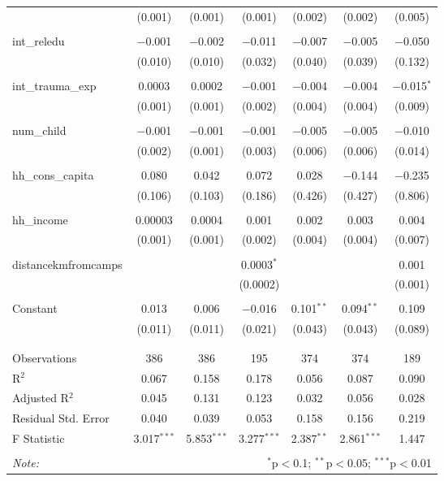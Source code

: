 \begin{table}[H]
\begin{tabular}{@{\extracolsep{4pt}}lcccccc}
  & (0.001) & (0.001) & (0.001) & (0.002) & (0.002) & (0.005) \\ 
  & & & & & & \\ 
 int\_reledu & $-$0.001 & $-$0.002 & $-$0.011 & $-$0.007 & $-$0.005 & $-$0.050 \\ 
  & (0.010) & (0.010) & (0.032) & (0.040) & (0.039) & (0.132) \\ 
  & & & & & & \\ 
 int\_trauma\_exp & 0.0003 & 0.0002 & $-$0.001 & $-$0.004 & $-$0.004 & $-$0.015$^{*}$ \\ 
  & (0.001) & (0.001) & (0.002) & (0.004) & (0.004) & (0.009) \\ 
  & & & & & & \\ 
 num\_child & $-$0.001 & $-$0.001 & $-$0.001 & $-$0.005 & $-$0.005 & $-$0.010 \\ 
  & (0.002) & (0.001) & (0.003) & (0.006) & (0.006) & (0.014) \\ 
  & & & & & & \\ 
 hh\_cons\_capita & 0.080 & 0.042 & 0.072 & 0.028 & $-$0.144 & $-$0.235 \\ 
  & (0.106) & (0.103) & (0.186) & (0.426) & (0.427) & (0.806) \\ 
  & & & & & & \\ 
 hh\_income & 0.00003 & 0.0004 & 0.001 & 0.002 & 0.003 & 0.004 \\ 
  & (0.001) & (0.001) & (0.002) & (0.004) & (0.004) & (0.007) \\ 
  & & & & & & \\ 
 distancekmfromcamps &  &  & 0.0003$^{*}$ &  &  & 0.001 \\ 
  &  &  & (0.0002) &  &  & (0.001) \\ 
  & & & & & & \\ 
 Constant & 0.013 & 0.006 & $-$0.016 & 0.101$^{**}$ & 0.094$^{**}$ & 0.109 \\ 
  & (0.011) & (0.011) & (0.021) & (0.043) & (0.043) & (0.089) \\ 
  & & & & & & \\ 
\hline \\[-1.8ex] 
Observations & 386 & 386 & 195 & 374 & 374 & 189 \\ 
R$^{2}$ & 0.067 & 0.158 & 0.178 & 0.056 & 0.087 & 0.090 \\ 
Adjusted R$^{2}$ & 0.045 & 0.131 & 0.123 & 0.032 & 0.056 & 0.028 \\ 
Residual Std. Error & 0.040 & 0.039 & 0.053 & 0.158 & 0.156 & 0.219 \\ 
F Statistic & 3.017$^{***}$ & 5.853$^{***}$ & 3.277$^{***}$ & 2.387$^{**}$ & 2.861$^{***}$ & 1.447 \\ 
\hline 
\hline \\[-1.8ex] 
\textit{Note:}  & \multicolumn{6}{r}{$^{*}$p$<$0.1; $^{**}$p$<$0.05; $^{***}$p$<$0.01} \\ 
\end{tabular} 
\end{table} 
